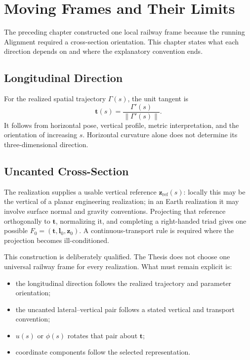 \chapter{Moving Frames and Their Limits}

The preceding chapter constructed one local railway frame because the running
Alignment required a cross-section orientation. This chapter states what each
direction depends on and where the explanatory convention ends.

\section{Longitudinal Direction}

For the realized spatial trajectory \(\Gamma(s)\), the unit tangent is
\[
\mathbf t(s)=\frac{\Gamma'(s)}{\|\Gamma'(s)\|}.
\]
It follows from horizontal pose, vertical profile, metric interpretation, and
the orientation of increasing \(s\). Horizontal curvature alone does not
determine its three-dimensional direction.

\section{Uncanted Cross-Section}

The realization supplies a usable vertical reference
\(\mathbf z_{\mathrm{ref}}(s)\): locally this may be the vertical of a planar
engineering realization; in an Earth realization it may involve surface
normal and gravity conventions. Projecting that reference orthogonally to
\(\mathbf t\), normalizing it, and completing a right-handed triad gives one
possible \(F_0=(\mathbf t,\mathbf l_0,\mathbf z_0)\). A continuous-transport
rule is required where the projection becomes ill-conditioned.

This construction is deliberately qualified. The Thesis does not choose one
universal railway frame for every realization. What must remain explicit is:
\begin{itemize}
\item the longitudinal direction follows the realized trajectory and
  parameter orientation;
\item the uncanted lateral--vertical pair follows a stated vertical and
  transport convention;
\item \(u(s)\) or \(\phi(s)\) rotates that pair about \(\mathbf t\);
\item coordinate components follow the selected representation.
\end{itemize}

